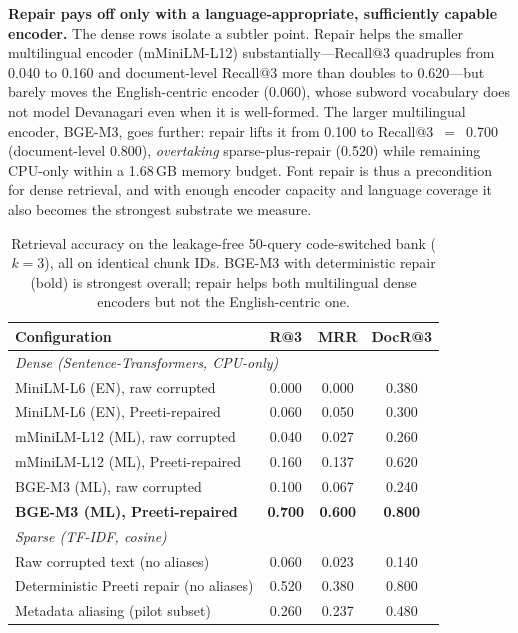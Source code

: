 \documentclass[journal]{IEEEtran}
\newcommand{\nqueries}{50}
\newcommand{\repRecall}{0.520}
\newcommand{\denseEnRepRecall}{0.060}
\newcommand{\denseMlRawRecall}{0.040}
\newcommand{\denseMlRepRecall}{0.160}
\newcommand{\denseMlRepDocRecall}{0.620}
\newcommand{\denseBgeRawRecall}{0.100}
\newcommand{\denseBgeRepRecall}{0.700}
\newcommand{\denseBgeRepDocRecall}{0.800}
\newcommand{\densePeakRSS}{1.68}
\begin{document}
\textbf{Repair pays off only with a language-appropriate, sufficiently capable encoder.} The dense rows isolate a subtler point. Repair helps the smaller multilingual encoder (mMiniLM-L12) substantially---Recall@3 quadruples from \denseMlRawRecall{} to \denseMlRepRecall{} and document-level Recall@3 more than doubles to \denseMlRepDocRecall{}---but barely moves the English-centric encoder (\denseEnRepRecall{}), whose subword vocabulary does not model Devanagari even when it is well-formed. The larger multilingual encoder, BGE-M3, goes further: repair lifts it from \denseBgeRawRecall{} to Recall@3~$=$~\denseBgeRepRecall{} (document-level \denseBgeRepDocRecall{}), \emph{overtaking} sparse-plus-repair (\repRecall{}) while remaining CPU-only within a \densePeakRSS{}\,GB memory budget. Font repair is thus a precondition for dense retrieval, and with enough encoder capacity and language coverage it also becomes the strongest substrate we measure.

\begin{table}[t]
\caption{Retrieval accuracy on the leakage-free \nqueries{}-query code-switched bank ($k{=}3$), all on identical chunk IDs. BGE-M3 with deterministic repair (bold) is strongest overall; repair helps both multilingual dense encoders but not the English-centric one.}
\label{tab:retrieval}
\centering
\begin{tabular}{p{4.6cm}ccc}
\toprule
\textbf{Configuration} & \textbf{R@3} & \textbf{MRR} & \textbf{DocR@3} \\
\midrule
\multicolumn{4}{l}{\emph{Dense (Sentence-Transformers, CPU-only)}}\\
MiniLM-L6 (EN), raw corrupted & 0.000 & 0.000 & 0.380 \\
MiniLM-L6 (EN), Preeti-repaired & 0.060 & 0.050 & 0.300 \\
mMiniLM-L12 (ML), raw corrupted & 0.040 & 0.027 & 0.260 \\
mMiniLM-L12 (ML), Preeti-repaired & 0.160 & 0.137 & 0.620 \\
BGE-M3 (ML), raw corrupted & 0.100 & 0.067 & 0.240 \\
\textbf{BGE-M3 (ML), Preeti-repaired} & \textbf{0.700} & \textbf{0.600} & \textbf{0.800} \\
\midrule
\multicolumn{4}{l}{\emph{Sparse (TF-IDF, cosine)}}\\
Raw corrupted text (no aliases) & 0.060 & 0.023 & 0.140 \\
Deterministic Preeti repair (no aliases) & 0.520 & 0.380 & 0.800 \\
Metadata aliasing (pilot subset) & 0.260 & 0.237 & 0.480 \\
\bottomrule
\end{tabular}
\end{table}
\end{document}
